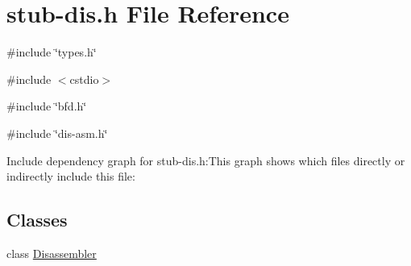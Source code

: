 \hypertarget{stub-dis_8h}{
\section{stub-\/dis.h File Reference}
\label{stub-dis_8h}
}
{\ttfamily \#include \char`\"{}types.h\char`\"{}}\par
{\ttfamily \#include $<$cstdio$>$}\par
{\ttfamily \#include \char`\"{}bfd.h\char`\"{}}\par
{\ttfamily \#include \char`\"{}dis-\/asm.h\char`\"{}}\par
Include dependency graph for stub-\/dis.h:This graph shows which files directly or indirectly include this file:\subsection*{Classes}
\begin{DoxyCompactItemize}
\item 
class \hyperlink{classDisassembler}{Disassembler}
\end{DoxyCompactItemize}
